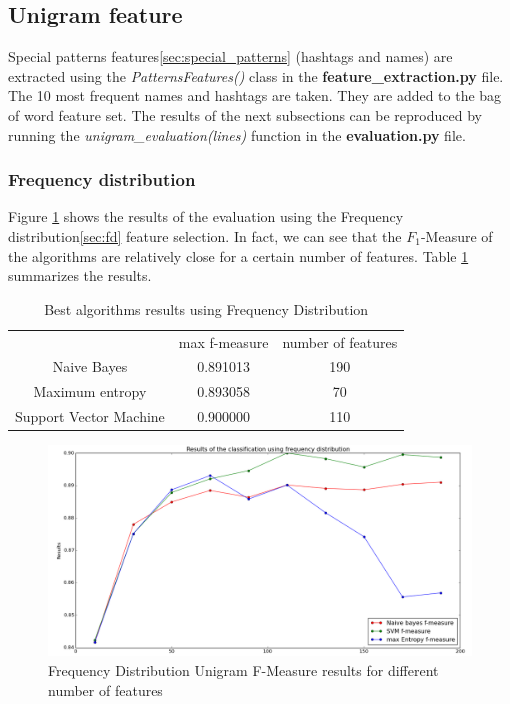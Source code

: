 \subsection{Unigram feature}


Special patterns features\ref{sec:special_patterns} (hashtags and names) are extracted using the \emph{PatternsFeatures()} class in the \textbf{feature\_extraction.py} file. The 10 most frequent names and hashtags are taken. They are added to the bag of word feature set.
The results of the next subsections can be reproduced by running the \emph{unigram\_evaluation(lines)} function in the  \textbf{evaluation.py} file.\\
\subsubsection{Frequency distribution}
Figure \ref{fig:fd_eval} shows the results of the evaluation using the Frequency distribution\ref{sec:fd} feature selection. In fact, we can see that the $F_1$-Measure of the algorithms are relatively close for a certain number of features. Table \ref{tab:fd_results} summarizes the results.

\begin{table}[H]
\begin{tabular}{c|c|c}
~ & max f-measure & number of features \\
Naive Bayes		&			 0.891013 		&		190\\
Maximum entropy		&		 0.893058 		&		70\\
Support Vector Machine	&	 0.900000 		&		110\\
\end{tabular}
\caption{Best algorithms results using Frequency Distribution}\label{tab:fd_results}
\end{table}



\begin{figure}[H]
  \centering
  \includegraphics[width=160mm]{figures/result_fd_graph.png}
  \caption{Frequency Distribution Unigram F-Measure results for different number of features \label{fig:fd_eval}}
\end{figure}



